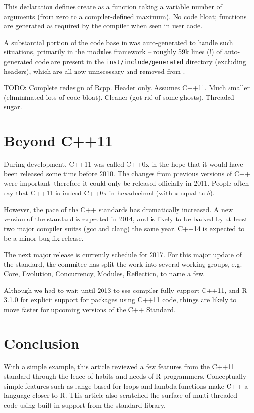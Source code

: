 This declaration defines create as a function taking a variable number of
arguments (from zero to a compiler-defined maximum). No code bloat; functions
are generated as required by the compiler when seen in user code.

A substantial portion of the code base in  was auto-generated to
handle such situations, primarily in the modules framework -- roughly 59k lines (!)
of auto-generated code are present in the \texttt{inst/include/generated}
directory (excluding headers), which are all now unnecessary and removed from
.

TODO:
Complete redesign of Rcpp.
Header only. Assumes C++11.
Much smaller (elimininated lots of code bloat).
Cleaner (got rid of some ghosts).
Threaded sugar.

\section{Beyond C++11}

During development, C++11 was called C++0x in the hope that it would have been
released some time before 2010. The changes from previous versions of C++
were important, therefore it could only be released officially in 2011. People
often say that C++11 is indeed C++0x in hexadecimal (with $x$ equal to $b$).

However, the pace of the C++ standards has dramatically increased. A new version
of the standard is expected in 2014, and is likely to be backed by at least
two major compiler suites (gcc and clang) the same year. C++14 is expected to
be a minor bug fix release.

The next major release is currently schedule for 2017. For this major
update of the standard, the commitee has split the work into several
working groups, e.g. Core, Evolution, Concurrency, Modules, Reflection, to name
a few.

Although we had to wait until 2013 to see compiler fully support C++11, and
R 3.1.0 for explicit support for packages using C++11 code, things are likely
to move faster for upcoming versions of the C++ Standard.

\section{Conclusion}

With a simple example, this article reviewed a few features from
the C++11 standard through the lence of habits and needs of R programmers.
Conceptually simple features such as range based for loops and lambda functions
make C++ a language closer to R. This article also scratched the surface
of multi-threaded code using built in support from the standard library.

